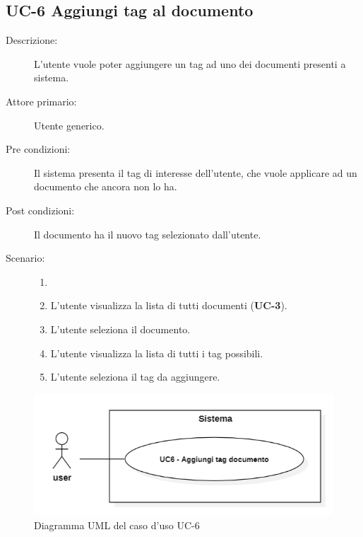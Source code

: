 \subsection{UC-6 Aggiungi tag al documento}
\begin{description}
    \item[Descrizione:] L’utente vuole poter aggiungere un tag ad uno dei documenti presenti a sistema.
    \item[Attore primario:] Utente generico.
    \item[Pre condizioni:] Il sistema presenta il tag di interesse dell'utente, che vuole applicare ad un documento che ancora non lo ha.
    \item[Post condizioni:] Il documento ha il nuovo tag selezionato dall’utente.
    \item[Scenario:]
    \begin{enumerate}
        \item[]
        \item L’utente visualizza la lista di tutti documenti (\textbf{UC-3}).
        \item L'utente seleziona il documento.
        \item L’utente visualizza la lista di tutti i tag possibili.
        \item L’utente seleziona il tag da aggiungere.
    \end{enumerate}
\end{description}

\begin{figure}[H]
    \centering
    \includegraphics[width=0.8\linewidth]{UC6.png} %
    \caption{Diagramma UML del caso d'uso UC-6}
    \label{fig:UC5}
\end{figure}

